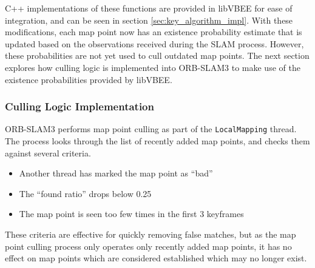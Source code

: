 C++ implementations of these functions are provided in libVBEE for ease of integration, and can be seen in section \ref{sec:key_algorithm_impl}. With these modifications, each map point now has an existence probability estimate that is updated based on the observations received during the SLAM process. However, these probabilities are not yet used to cull outdated map points. The next section explores how culling logic is implemented into ORB-SLAM3 to make use of the existence probabilities provided by libVBEE.

\subsubsection{Culling Logic Implementation}
\label{sec:orb_slam3_culling_logic}

ORB-SLAM3 performs map point culling as part of the \texttt{LocalMapping} thread. The process looks through the list of recently added map points, and checks them against several criteria.
\begin{itemize}
    \item Another thread has marked the map point as ``bad''
    \item The ``found ratio'' drops below 0.25
    \item The map point is seen too few times in the first 3 keyframes
\end{itemize}

These criteria are effective for quickly removing false matches, but as the map point culling process only operates only recently added map points, it has no effect on map points which are considered established which may no longer exist.

